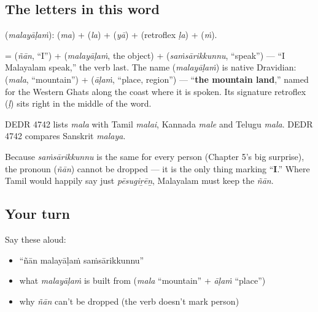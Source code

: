 \subsection*{The letters in this word}
\textbf{} (\emph{malayāḷaṁ}): \textbf{} (\emph{ma}) + \textbf{} (\emph{la}) + \textbf{} (\emph{yā}) + \textbf{} (retroflex \emph{ḷa}) + \textbf{} (\emph{ṁ}).

\begin{cousinweb}
\textbf{  } = \textbf{} (\emph{ñān}, \textquotedblleft{}I\textquotedblright{}) + \textbf{} (\emph{malayāḷaṁ}, the object) + \textbf{} (\emph{saṁsārikkunnu}, \textquotedblleft{}speak\textquotedblright{}) — \textquotedblleft{}I Malayalam speak,\textquotedblright{} the verb last. The name \textbf{} (\emph{malayāḷaṁ}) is native Dravidian: \textbf{} (\emph{mala}, \textquotedblleft{}mountain\textquotedblright{}) + \textbf{} (\emph{āḷaṁ}, \textquotedblleft{}place, region\textquotedblright{}) — \textquotedblleft{}\textbf{the mountain land},\textquotedblright{} named for the Western Ghats along the coast where it is spoken. Its signature retroflex \textbf{} (\emph{ḷ}) sits right in the middle of the word.

DEDR 4742 lists \emph{mala} with Tamil \emph{malai}, Kannada \emph{male} and Telugu \emph{mala}. DEDR 4742 compares Sanskrit \emph{malaya}.
\end{cousinweb}

\begin{grammarlens}[title={Grammar Lens: the pronoun stays}]
Because \emph{saṁsārikkunnu} is the same for every person (Chapter 5's big surprise), the pronoun \textbf{} (\emph{ñān}) cannot be dropped — it is the only thing marking \textquotedblleft{}\textbf{I}.\textquotedblright{} Where Tamil would happily say just \emph{pēsugiṟēṉ}, Malayalam must keep the \emph{ñān}.
\end{grammarlens}

\subsection*{Your turn}
Say these aloud:

\begin{itemize}
\raggedright
  \item \textquotedblleft{}ñān malayāḷaṁ saṁsārikkunnu\textquotedblright{}
  \item what \emph{malayāḷaṁ} is built from (\emph{mala} \textquotedblleft{}mountain\textquotedblright{} + \emph{āḷaṁ} \textquotedblleft{}place\textquotedblright{})
  \item why \emph{ñān} can't be dropped (the verb doesn't mark person)
\end{itemize}

